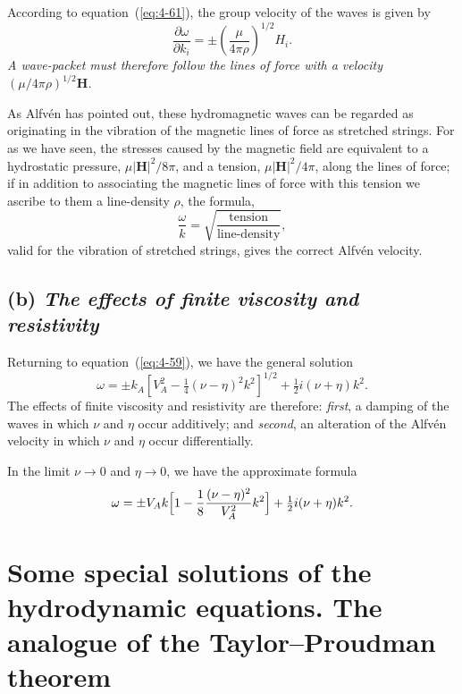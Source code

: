 According to equation~(\ref{eq:4-61}), the group velocity of the waves is given by
\begin{equation}
\label{eq:4-64}
\frac{\partial\omega}{\partial k_i} = \pm\left(\frac{\mu}{4\pi\rho}\right)^{\!1/2}\!H_i.
\end{equation}
\emph{A wave-packet must therefore follow the lines of force with a velocity $(\mu/4\pi\rho)^{1/2}\mathbf{H}$.}

As Alfv\'en has pointed out, these hydromagnetic waves can be regarded as originating in the vibration of the magnetic lines of force as stretched strings. For as we have seen, the stresses caused by the magnetic field are equivalent to a hydrostatic pressure, $\mu|\mathbf{H}|^2/8\pi$, and a tension, $\mu|\mathbf{H}|^2/4\pi$, along the lines of force; if in addition to associating the magnetic lines of force with this tension we ascribe to them a line-density $\rho$, the formula,
\begin{equation}
\label{eq:4-65}
\frac{\omega}{k} = \sqrt{\frac{\text{tension}}{\text{line-density}}},
\end{equation}
valid for the vibration of stretched strings, gives the correct Alfv\'en velocity.

\subsection*{(b) \emph{The effects of finite viscosity and resistivity}}

Returning to equation~(\ref{eq:4-59}), we have the general solution
\begin{equation}
\label{eq:4-66}
\omega = \pm k_A[V_A^2 - \tfrac{1}{4}(\nu-\eta)^2 k^2]^{1/2} + \tfrac{1}{2}i(\nu+\eta)k^2.
\end{equation}
The effects of finite viscosity and resistivity are therefore: \emph{first}, a damping of the waves in which $\nu$ and $\eta$ occur additively; and \emph{second}, an alteration of the Alfv\'en velocity in which $\nu$ and $\eta$ occur differentially.

In the limit $\nu\to 0$ and $\eta\to 0$, we have the approximate formula
\begin{equation}
\label{eq:4-67}
\omega = \pm V_A k\Bigl[1-\frac{1}{8}\frac{(\nu-\eta)^2}{V_A^2}k^2\Bigr]+\tfrac{1}{2}i(\nu+\eta)k^2.
\end{equation}

\section{Some special solutions of the hydrodynamic equations. The analogue of the Taylor--Proudman theorem}\label{sec:40}

